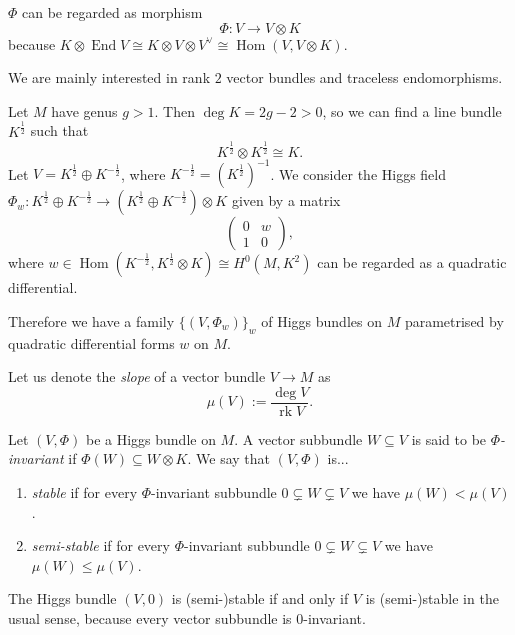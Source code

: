 \documentclass[A4paper, 12pt, british, reqno]{amsart}
\DeclareMathOperator{\Hom}{Hom}
\DeclareMathOperator{\End}{End}
\DeclareMathOperator{\rk}{rk}
\newcommand{\ot}{\otimes}
\newcommand{\op}{\oplus}
\newcommand{\dual}{^{\vee}}
\begin{document}
\begin{rem}
    $\Phi$ can be regarded as morphism
    \[ \Phi\colon V\to V\ot K \]
    because $K\ot \End{V}\cong K\ot V\ot V\dual\cong \Hom(V,V\ot K)$.
\end{rem}

\begin{rem}
    We are mainly interested in rank $2$ vector bundles and traceless endomorphisms.
\end{rem}

\begin{exa}
    Let $M$ have genus $g>1$.
    Then $\deg{K}=2g-2>0$, so we can find a line bundle $K^{\frac{1}{2}}$ such that
    \[ K^{\frac{1}{2}}\ot K^{\frac{1}{2}}\cong K. \]
    Let $V=K^{\frac{1}{2}}\op K^{-\frac{1}{2}}$, where $K^{-\frac{1}{2}}=(K^{\frac{1}{2}})^{-1}$.
    We consider the Higgs field $\Phi_{w}\colon K^{\frac{1}{2}}\op K^{-\frac{1}{2}}\to (K^{\frac{1}{2}}\op K^{-\frac{1}{2}})\ot K$ given by a matrix
    \[
	\begin{pmatrix}
	    0 & w \\
	    1 & 0
	\end{pmatrix},
    \]
    where $w\in \Hom(K^{-\frac{1}{2}},K^{\frac{1}{2}}\ot K)\cong H^{0}(M,K^{2})$ can be regarded as a quadratic differential.

    Therefore we have a family $\{(V,\Phi_{w})\}_{w}$ of Higgs bundles on $M$ parametrised by quadratic differential forms $w$ on $M$.
\end{exa}

Let us denote the \textit{slope} of a vector bundle $V\to M$ as
\[ \mu(V):=\frac{\deg{V}}{\rk{V}}. \]

\begin{defn}
    Let $(V,\Phi)$ be a Higgs bundle on $M$.
    A vector subbundle $W\subseteq V$ is said to be \textit{$\Phi$-invariant} if $\Phi(W)\subseteq W\ot K$.
    We say that $(V,\Phi)$ is...
    \begin{enumerate}[label=\roman*)]
	\item \textit{stable} if for every $\Phi$-invariant subbundle $0\subsetneq W\subsetneq V$ we have $\mu(W) <\mu(V)$.
	\item \textit{semi-stable} if for every $\Phi$-invariant subbundle $0\subsetneq W\subsetneq V$ we have $\mu(W)\leqslant \mu(V)$.
    \end{enumerate}
\end{defn}

\begin{rem}
    The Higgs bundle $(V,0)$ is (semi-)stable if and only if $V$ is (semi-)stable in the usual sense, because every vector subbundle is $0$-invariant.
\end{rem}
\end{document}
